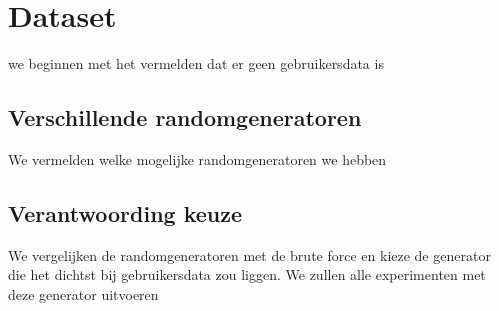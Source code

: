 \documentclass[Main.tex]{subfiles}
\begin{document}
\section{Dataset}
we beginnen met het vermelden dat er geen gebruikersdata is
\subsection{Verschillende randomgeneratoren}
We vermelden welke mogelijke randomgeneratoren we hebben
\subsection{Verantwoording keuze}
We vergelijken de randomgeneratoren met de brute force en kieze de generator die het dichtst bij gebruikersdata zou liggen. We zullen alle experimenten met deze generator uitvoeren
\end{document}
